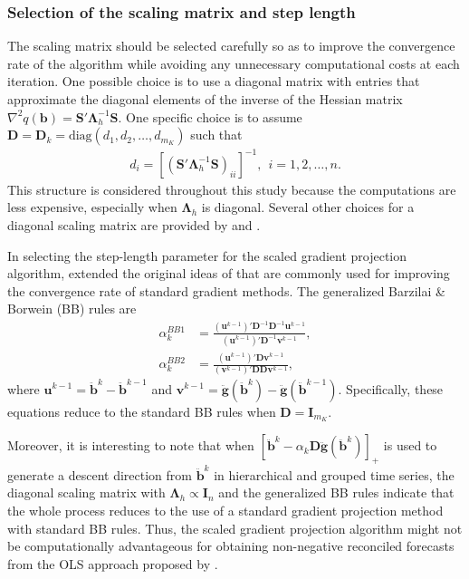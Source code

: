 \documentclass[11pt]{article}
\newcommand{\0}{\phantom{0}}
\begin{document}
\subsubsection*{Selection of the scaling matrix and step length}

The scaling matrix should be selected carefully so as to improve the convergence rate of the algorithm while avoiding any unnecessary computational costs at each iteration. One possible choice is to use a diagonal matrix with entries that approximate the diagonal elements of the inverse of the Hessian matrix $\nabla^{2}q(\bm{b}) = \bm{S}'\bm{\Lambda}_{h}^{-1}\bm{S}$. One specific choice is to assume $\bm{D} = \bm{D}_{k} = \text{diag}(d_{1}, d_{2}, \dots, d_{m_{K}})$ such that
\begin{align*}
d_{i} = \left[\left(\bm{S}'\bm{\Lambda}_{h}^{-1}\bm{S}\right)_{ii}\right]^{-1}, \ \ i = 1, 2, \dots, n.
\end{align*}
This structure is considered throughout this study because the computations are less expensive, especially when $\bm{\Lambda}_{h}$ is diagonal. Several other choices for a diagonal scaling matrix are provided by \citet{Bonettini2009} and \citet{Bertero2013}. 

In selecting the step-length parameter for the scaled gradient projection algorithm, \citet{Bonettini2009} extended the original ideas of \citet{Barzilai1988} that are commonly used for improving the convergence rate of standard gradient methods. The generalized Barzilai \& Borwein (BB) rules are
\begin{align*}
\alpha_{k}^{BB1} & = \frac{(\bm{u}^{k-1})'\bm{D}^{-1} \bm{D}^{-1} \bm{u}^{k-1}}{(\bm{u}^{k-1})'\bm{D}^{-1}\bm{v}^{k-1}},\\
\alpha_{k}^{BB2} & = \frac{(\bm{u}^{k-1})'\bm{D}\bm{v}^{k-1}}{(\bm{v}^{k-1})'\bm{D}\bm{D}\bm{v}^{k-1}},
\end{align*}
where $\bm{u}^{k-1} = \ddot{\bm{b}}^{k} - \ddot{\bm{b}}^{k-1}$ and $\bm{v}^{k-1} = \ddot{\bm{g}}(\ddot{\bm{b}}^{k}) - \ddot{\bm{g}}(\ddot{\bm{b}}^{k-1})$. Specifically, these equations reduce to the standard BB rules when $\bm{D} = \bm{I}_{m_{K}}$.

Moreover, it is interesting to note that when $[\ddot{\bm{b}}^{k} - \alpha_{k} \bm{D} \ddot{\bm{g}}(\ddot{\bm{b}}^{k})]_{+}$ is used to generate a descent direction from $\ddot{\bm{b}}^{k}$ in hierarchical and grouped time series, the diagonal scaling matrix with $\bm{\Lambda}_{h} \propto \bm{I}_{n}$ and the generalized BB rules indicate that the whole process reduces to the use of a standard gradient projection method with standard BB rules. Thus, the scaled gradient projection algorithm might not be computationally advantageous for obtaining non-negative reconciled forecasts from the OLS approach proposed by \citet{Hyndman2011}. 
\end{document}
